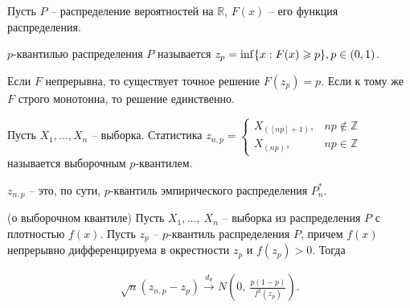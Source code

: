 Пусть $\displaystyle P$ -- распределение вероятностей на $\displaystyle \mathbb{R}$, $\displaystyle F( x)$ -- его функция распределения.
\begin{definition}
$\displaystyle p$-квантилью распределения $\displaystyle P$ называется $\displaystyle z_{p} =\inf\{x:F( x) \geqslant p\},\\ p \in (0,1)$.
\end{definition}
\begin{note}
Если $\displaystyle F$ непрерывна, то существует точное решение $\displaystyle F( z_{p}) =p$. Если к тому же $\displaystyle F$ строго монотонна, то решение единственно.
\end{note}
\begin{definition}
Пусть $\displaystyle X_{1} ,\dotsc ,X_{n}$ -- выборка. Статистика $\displaystyle z_{n,p} =\begin{cases}
X_{([ np] +1)}, & np\notin \mathbb{Z}\\
X_{( np)}, & np\in \mathbb{Z}
\end{cases}$ называется выборочным $\displaystyle p$-квантилем.
\end{definition}
\begin{note}
$\displaystyle z_{n,p}$ -- это, по сути, $\displaystyle p$-квантиль эмпирического распределения $\displaystyle P_{n}^{*}$.
\end{note}
\begin{theorem}
(о выборочном квантиле) Пусть $\displaystyle X_{1} ,\dotsc ,\ X_{n}$ -- выборка из распределения $\displaystyle P$ с плотностью $\displaystyle f( x)$. Пусть $\displaystyle z_{p}$ -- $\displaystyle p$-квантиль распределения $\displaystyle P$, причем $\displaystyle f( x)$ непрерывно дифференцируема в окрестности $\displaystyle z_{p}$ и $\displaystyle f( z_{p})  >0$. Тогда


\begin{gather*}
\sqrt{n}( z_{n,p} -z_{p})\xrightarrow{d_{\theta }} N\left( 0,\ \frac{p( 1-p)}{f^{2}( z_{p})}\right) .
\end{gather*}
\end{theorem}
